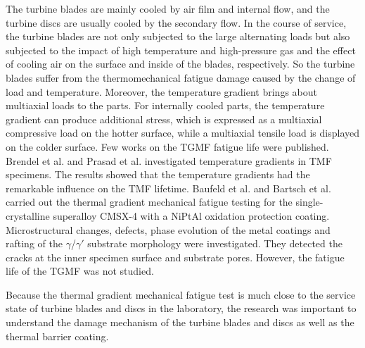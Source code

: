The turbine blades are mainly cooled by air film and internal flow, and the turbine discs are usually cooled by the secondary flow.
In the course of service, the turbine blades are not only subjected to the large alternating loads but also subjected to the impact of high temperature and high-pressure gas and the effect of cooling air on the surface and inside of the blades, respectively. So the turbine blades suffer from the thermomechanical fatigue damage caused by the change of load and temperature.
Moreover, the temperature gradient brings about multiaxial loads to the parts.
For internally cooled parts, the temperature gradient can produce additional stress, which is expressed as a multiaxial compressive load on the hotter surface, while a multiaxial tensile load is displayed on the colder surface.
Few works on the TGMF fatigue life were published.
Brendel et al. \cite{BRENDEL2008234} and Prasad et al. \cite{PRASAD2013131} investigated temperature gradients in TMF specimens. The results showed that the temperature gradients had the remarkable influence on the TMF lifetime.
Baufeld et al. \cite{BAUFELD2008219} and Bartsch et al. \cite{BARTSCH2008211} carried out the thermal gradient mechanical fatigue testing for the single-crystalline superalloy CMSX-4 with a NiPtAl oxidation protection coating.
Microstructural changes, defects, phase evolution of the metal coatings and rafting of the $\gamma$/$\gamma'$ substrate morphology were investigated. They detected the cracks at the inner specimen surface and substrate pores. However, the fatigue life of the TGMF was not studied.

Because the thermal gradient mechanical fatigue test is much close to the service state of turbine blades and discs in the laboratory, the research was important to understand the damage mechanism of the turbine blades and discs as well as the thermal barrier coating.


